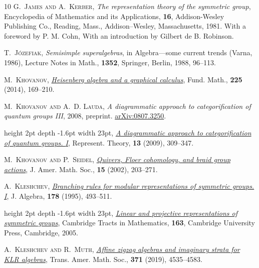 \documentclass[a4paper,11pt]{amsart}
\numberwithin{equation}{subsection}
\theoremstyle{definition}
\theoremstyle{theorem}
\theoremstyle{remark}
\begin{document}
\begin{thebibliography}{10}
\textsc{G.~James and A.~Kerber}, \textit{The representation theory of the
  symmetric group}, Encyclopedia of Mathematics and its Applications,
  \textbf{16}, Addison-Wesley Publishing Co., Reading, Mass., Addison--Wesley,
  Massachusetts, 1981.
\newblock With a foreword by P. M. Cohn, With an introduction by Gilbert de B.
  Robinson.

\textsc{T.~J\'{o}zefiak}, \textit{Semisimple superalgebras}, in Algebra---some
  current trends ({V}arna, 1986), Lecture Notes in Math., \textbf{1352},
  Springer, Berlin, 1988, 96--113.

\textsc{M.~Khovanov},
  \href{http://dx.doi.org/10.4064/fm225-1-8}{\textit{Heisenberg algebra and a
  graphical calculus}}, Fund. Math., \textbf{225} (2014), 169--210.

\textsc{M.~Khovanov and A.~D. Lauda}, \textit{A diagrammatic approach to
  categorification of quantum groups {III}}, 2008, preprint.
\newblock \href{http://arxiv.org/abs/0807.3250}{arXiv:0807.3250}.

\leavevmode\vrule height 2pt depth -1.6pt width 23pt,
  \href{http://dx.doi.org/10.1090/S1088-4165-09-00346-X}{\textit{A diagrammatic
  approach to categorification of quantum groups. {I}}}, Represent. Theory,
  \textbf{13} (2009), 309--347.

\textsc{M.~Khovanov and P.~Seidel},
  \href{http://dx.doi.org/10.1090/S0894-0347-01-00374-5}{\textit{Quivers,
  {F}loer cohomology, and braid group actions}}, J. Amer. Math. Soc.,
  \textbf{15} (2002), 203--271.

\textsc{A.~Kleshchev},
  \href{http://dx.doi.org/10.1006/jabr.1995.1362}{\textit{Branching rules for
  modular representations of symmetric groups. {I}}}, J. Algebra, \textbf{178}
  (1995), 493--511.

\leavevmode\vrule height 2pt depth -1.6pt width 23pt,
  \href{http://dx.doi.org/10.1017/CBO9780511542800}{\textit{Linear and
  projective representations of symmetric groups}}, Cambridge Tracts in
  Mathematics, \textbf{163}, Cambridge University Press, Cambridge, 2005.

\textsc{A.~Kleshchev and R.~Muth},
  \href{http://dx.doi.org/10.1090/tran/7464}{\textit{Affine zigzag algebras and
  imaginary strata for {KLR} algebras}}, Trans. Amer. Math. Soc., \textbf{371}
  (2019), 4535--4583.


\end{thebibliography}
\end{document}
